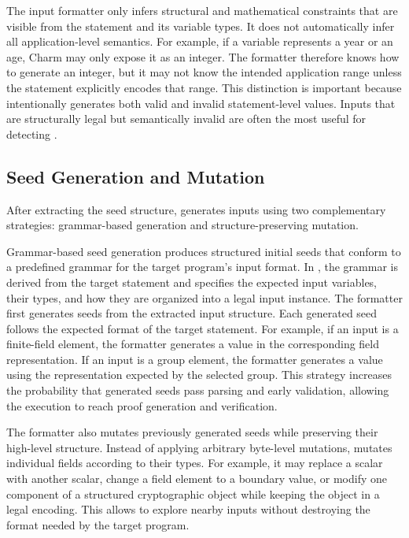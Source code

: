 The input formatter only infers structural and mathematical constraints that are visible from the statement and its variable types. It does not automatically infer all application-level semantics. For example, if a variable represents a year or an age, Charm may only expose it as an integer. The formatter therefore knows how to generate an integer, but it may not know the intended application range unless the statement explicitly encodes that range. This distinction is important because \greyboxfuzz intentionally generates both valid and invalid statement-level values. Inputs that are structurally legal but semantically invalid are often the most useful for detecting \logicerror.

\subsection{Seed Generation and Mutation}

After extracting the seed structure, \greyboxfuzz generates inputs using two complementary strategies: grammar-based generation and structure-preserving mutation.

Grammar-based seed generation produces structured initial seeds that conform to a predefined grammar for the target program's input format. In \greyboxfuzz, the grammar is derived from the target statement and specifies the expected input variables, their types, and how they are organized into a legal input instance. The formatter first generates seeds from the extracted input structure. Each generated seed follows the expected format of the target statement. For example, if an input is a finite-field element, the formatter generates a value in the corresponding field representation. If an input is a group element, the formatter generates a value using the representation expected by the selected group. This strategy increases the probability that generated seeds pass parsing and early validation, allowing the execution to reach proof generation and verification.

The formatter also mutates previously generated seeds while preserving their high-level structure. Instead of applying arbitrary byte-level mutations, \greyboxfuzz mutates individual fields according to their types. For example, it may replace a scalar with another scalar, change a field element to a boundary value, or modify one component of a structured cryptographic object while keeping the object in a legal encoding. This allows \greyboxfuzz to explore nearby inputs without destroying the format needed by the target program.

